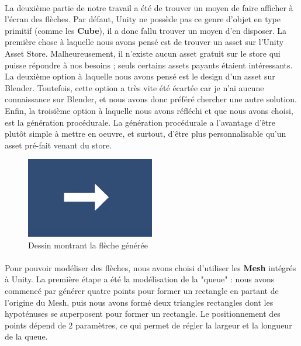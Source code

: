 \paragraph{} \hspace{10mm}
La deuxième partie de notre travail a été de trouver un moyen de faire afficher à l'écran des flèches. Par défaut, Unity ne possède pas ce genre d'objet en type primitif (comme les \textbf{Cube}), il a donc fallu trouver un moyen d'en disposer. La première chose à laquelle nous avons pensé est de trouver un asset sur l'Unity Asset Store. Malheureusement, il n'existe aucun asset gratuit sur le store qui puisse répondre à nos besoins ; seuls certains assets payants étaient intéressants. La deuxième option à laquelle nous avons pensé est le design d'un asset sur Blender. Toutefois, cette option a très vite été écartée car je n'ai aucune connaissance sur Blender, et nous avons donc préféré chercher une autre solution. Enfin, la troisième option à laquelle nous avons réfléchi et que nous avons choisi, est la génération procédurale. La génération procédurale a l'avantage d'être plutôt simple à mettre en oeuvre, et surtout, d'être plus personnalisable qu'un asset pré-fait venant du store.

\begin{figure} [H]
    \centering
    \includegraphics[width=0.5\textwidth]{assets/unity/screen_fleche2.png}
    \caption{Dessin montrant la flèche générée}
    \label{fig:dessinFleche2}
\end{figure}

\paragraph{} \hspace{10mm}
Pour pouvoir modéliser des flèches, nous avons choisi d'utiliser les \textbf{Mesh} intégrés à Unity. La première étape a été la modélisation de la "queue" : nous avons commencé par générer quatre points pour former un rectangle en partant de l'origine du Mesh, puis nous avons formé deux triangles rectangles dont les hypoténuses se superposent pour former un rectangle. Le positionnement des points dépend de 2 paramètres, ce qui permet de régler la largeur et la longueur de la queue. 

